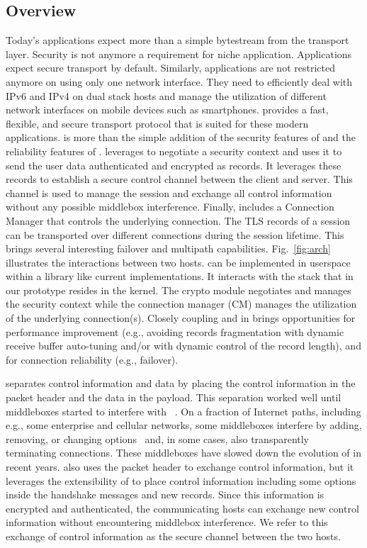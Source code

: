 \subsection{Overview}
Today's applications expect more than a simple bytestream from the transport
layer. Security is not anymore a requirement for niche application. Applications
expect secure transport by default. Similarly, applications are not restricted
anymore on using only one network interface. They need to efficiently deal with
IPv6 and IPv4 on dual stack hosts and manage the utilization of different
network interfaces on mobile devices such as smartphones. \tcpls provides a
fast, flexible, and secure transport protocol that is suited for these modern
applications. \tcpls is more than the simple addition of the security features
of \tls and the reliability features of \tcp. \tcpls leverages  to
negotiate a security context and uses it to send the user data authenticated and
encrypted as \tls records. It leverages these records to establish a secure
control channel between the client and server. This channel is used to manage
the \tcpls session and exchange all control information without any possible
middlebox interference. Finally, \tcpls includes a Connection Manager that
controls the underlying \tcp connection. The TLS records of a \tcpls session can
be transported over different \tcp connections during the session lifetime. This
brings several interesting failover and multipath capabilities.
Fig.~\ref{fig:arch} illustrates the interactions between two \tcpls hosts.
\tcpls can be implemented in userspace within a library like current \tls
implementations. It interacts with the \tcp stack that in our prototype resides
in the kernel. The crypto module negotiates and manages the security context
while the connection manager (CM) manages the utilization of the underlying \tcp
connection(s). Closely coupling \tcp and \tls in \tcpls brings opportunities for
performance improvement (e.g., avoiding records fragmentation with dynamic
receive buffer auto-tuning and/or with dynamic control of the record length),
and for connection reliability (e.g., failover).


\tcp separates control information and data by placing the control information
in the packet header and the data in the payload. This separation worked well
until middleboxes started to interfere with \tcp~\cite{10.1145/1064413.1064418,
  honda2011still}. On a fraction of Internet paths, including e.g., some
enterprise and cellular networks, some middleboxes interfere by adding,
removing, or changing \tcp
options~\cite{wang2011untold,honda2011still,xu2015investigating} and, in some
cases, also transparently terminating \tcp connections. These middleboxes have
slowed down the evolution of \tcp in recent years. \tcpls also uses the packet
header to exchange \tcp control information, but it leverages the extensibility
of  to place control information including some \tcp options inside the
\tls handshake messages and new \tls records. Since this information is
encrypted and authenticated, the communicating hosts can exchange new control
information without encountering middlebox interference. We refer to this
exchange of control information as the secure channel between the two hosts.

